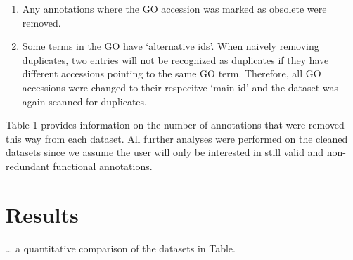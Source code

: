 \documentclass[utf8]{frontiersSCNS}
\providecommand{\tightlist}{%
  \setlength{\itemsep}{0pt}\setlength{\parskip}{0pt}}
\begin{document}
\begin{enumerate}
\def\labelenumi{\arabic{enumi}.}
\tightlist
\item
  Any annotations where the GO accession was marked as obsolete were removed.
\item
  Some terms in the GO have `alternative ids'. When naively removing duplicates, two entries will not be recognized as duplicates if they have different accessions pointing to the same GO term. Therefore, all GO accessions were changed to their respecitve `main id' and the dataset was again scanned for duplicates.
\end{enumerate}

Table 1 provides information on the number of annotations that were removed this way from each dataset.
All further analyses were performed on the cleaned datasets since we assume the user will only be interested in still valid and non-redundant functional annotations.

\hypertarget{results}{%
\section{Results}\label{results}}

\ldots{} a quantitative comparison of the datasets in Table.
\end{document}
